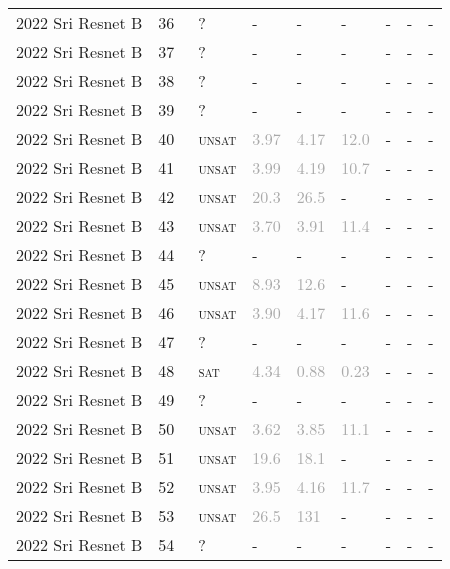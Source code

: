 \begin{center}
{\begin{longtable}{@{}lllllllll@{}}
2022 Sri Resnet B & 36 & ~? & - & - & - & - & - & - \\
2022 Sri Resnet B & 37 & ~? & - & - & - & - & - & - \\
2022 Sri Resnet B & 38 & ~? & - & - & - & - & - & - \\
2022 Sri Resnet B & 39 & ~? & - & - & - & - & - & - \\
2022 Sri Resnet B & 40 & ~\textsc{unsat} & \textcolor{darkgray}{3.97} & \textcolor{darkgray}{4.17} & \textcolor{darkgray}{12.0} & - & - & - \\
2022 Sri Resnet B & 41 & ~\textsc{unsat} & \textcolor{darkgray}{3.99} & \textcolor{darkgray}{4.19} & \textcolor{darkgray}{10.7} & - & - & - \\
2022 Sri Resnet B & 42 & ~\textsc{unsat} & \textcolor{darkgray}{20.3} & \textcolor{darkgray}{26.5} & - & - & - & - \\
2022 Sri Resnet B & 43 & ~\textsc{unsat} & \textcolor{darkgray}{3.70} & \textcolor{darkgray}{3.91} & \textcolor{darkgray}{11.4} & - & - & - \\
2022 Sri Resnet B & 44 & ~? & - & - & - & - & - & - \\
2022 Sri Resnet B & 45 & ~\textsc{unsat} & \textcolor{darkgray}{8.93} & \textcolor{darkgray}{12.6} & - & - & - & - \\
2022 Sri Resnet B & 46 & ~\textsc{unsat} & \textcolor{darkgray}{3.90} & \textcolor{darkgray}{4.17} & \textcolor{darkgray}{11.6} & - & - & - \\
2022 Sri Resnet B & 47 & ~? & - & - & - & - & - & - \\
2022 Sri Resnet B & 48 & ~\textsc{sat} & \textcolor{darkgray}{4.34} & \textcolor{darkgray}{0.88} & \textcolor{darkgray}{0.23} & - & - & - \\
2022 Sri Resnet B & 49 & ~? & - & - & - & - & - & - \\
2022 Sri Resnet B & 50 & ~\textsc{unsat} & \textcolor{darkgray}{3.62} & \textcolor{darkgray}{3.85} & \textcolor{darkgray}{11.1} & - & - & - \\
2022 Sri Resnet B & 51 & ~\textsc{unsat} & \textcolor{darkgray}{19.6} & \textcolor{darkgray}{18.1} & - & - & - & - \\
2022 Sri Resnet B & 52 & ~\textsc{unsat} & \textcolor{darkgray}{3.95} & \textcolor{darkgray}{4.16} & \textcolor{darkgray}{11.7} & - & - & - \\
2022 Sri Resnet B & 53 & ~\textsc{unsat} & \textcolor{darkgray}{26.5} & \textcolor{darkgray}{131} & - & - & - & - \\
2022 Sri Resnet B & 54 & ~? & - & - & - & - & - & - \\

\end{longtable}}
\end{center}
